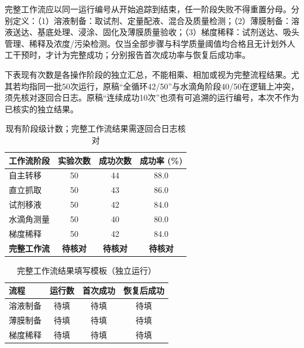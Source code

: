 完整工作流应以同一运行编号从开始追踪到结束，任一阶段失败不得重置分母。分别定义：（1）溶液制备：取试剂、定量配液、混合及质量检测；（2）薄膜制备：溶液送达、基底处理、浸涂、固化及薄膜质量验收；（3）梯度稀释：试剂送达、吸头管理、稀释及浓度/污染检测。仅当全部步骤与科学质量阈值均合格且无计划外人工干预时，才计为完整成功；分别报告首次成功率与恢复后成功率。

下表现有次数是各操作阶段的独立汇总，不能相乘、相加或视为完整流程结果。尤其若均指同一批50次运行，原稿“全循环42/50”与水滴角阶段40/50在逻辑上冲突，须先核对逐回合日志。原稿“连续成功10次”也须有可追溯的运行编号，本次不作为已核实的独立结果。

\begin{table}[!t]
\renewcommand{\arraystretch}{1.3}
\caption{现有阶段级计数；完整工作流结果需逐回合日志核对}
\label{tab:end_to_end}
\centering
\begin{tabular}{lccc}
\hline\hline
\textbf{工作流阶段} & \textbf{实验次数} & \textbf{成功次数} & \textbf{成功率 (\%)} \\ \hline
自主转移 & 50 & 44 & 88.0 \\
直立抓取 & 50 & 43 & 86.0 \\
试剂移液 & 50 & 42 & 84.0 \\
水滴角测量 & 50 & 40 & 80.0 \\
梯度稀释 & 50 & 42 & 84.0 \\ \hline
\textbf{完整工作流} & \textbf{待核对} & \textbf{待核对} & \textbf{待核对} \\ \hline\hline
\end{tabular}
\end{table}

\begin{table}[!t]
\caption{完整工作流结果填写模板（独立运行）}
\label{tab:workflow_complete}
\centering
\begin{tabular}{lccc}
\hline\hline
\textbf{流程} & \textbf{运行数} & \textbf{首次成功} & \textbf{恢复后成功} \\ \hline
溶液制备 & 待填 & 待填 & 待填 \\
薄膜制备 & 待填 & 待填 & 待填 \\
梯度稀释 & 待填 & 待填 & 待填 \\ \hline\hline
\end{tabular}
\end{table}

